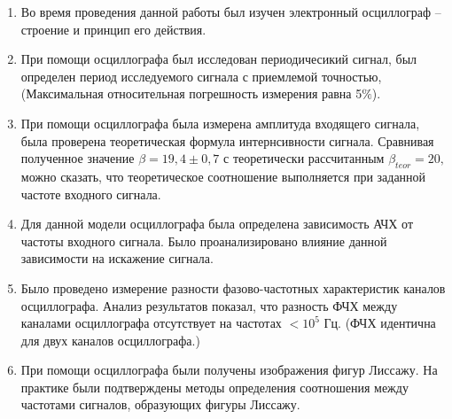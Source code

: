 \documentclass[12pt,a4paper]{article}
\begin{document}
	\begin{enumerate}
	\item Во время проведения данной работы был изучен электронный осциллограф -- строение и принцип его действия.
	\item При помощи осциллографа был исследован периодичесикий сигнал, был определен период исследуемого сигнала с приемлемой точностью, (Максимальная относительная погрешность измерения равна 5$\%$).
	\item При помощи осциллографа была измерена амплитуда входящего сигнала, была проверена теоретическая формула интернсивности сигнала. Сравнивая полученное значение $ \beta = 19,4 \pm 0,7 $ с теоретически рассчитанным $ \beta_{teor} = 20 , $ можно сказать, что теоретическое соотношение выполняется при заданной частоте входного сигнала.
	\item Для данной модели осциллографа была определена зависимость АЧХ от частоты входного сигнала. Было проанализировано влияние данной зависимости на искажение сигнала.
	\item Было проведено измерение разности фазово-частотных характеристик каналов осциллографа. Анализ результатов показал, что разность ФЧХ между каналами осциллографа отсутствует на частотах $< 10^{5}$ Гц. (ФЧХ идентична для двух каналов осциллографа.)
	\item При помощи осциллографа были получены изображения фигур Лиссажу. На практике были подтверждены методы определения соотношения между частотами сигналов, образующих фигуры Лиссажу.
	\end{enumerate}
\end{document}
